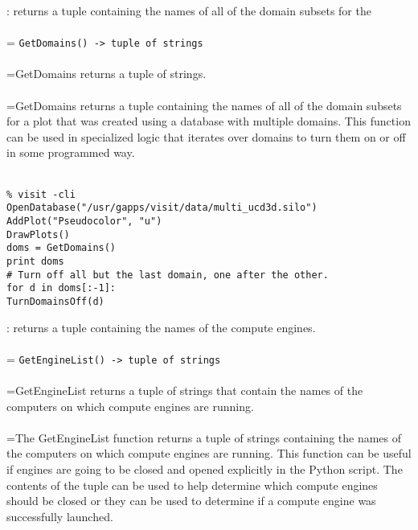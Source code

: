 \documentclass[10pt,a4paper]{report}
\begin{document}
{}
: returns a tuple containing the names of all of the domain subsets for the\\[-3mm]

 \\ 
\hangindent=\parindent 
\verb!GetDomains() -> tuple of strings!\\ [-3mm]

 \\ 
\hangindent=\parindent GetDomains returns a tuple of strings. \\[-3mm] 

 \\ 
\hangindent=\parindent GetDomains returns a tuple containing the names of all of the domain subsets for a plot that was created using a database with multiple domains. This function can be used in specialized logic that iterates over domains to turn them on or off in some programmed way. \\[-3mm] 

\\[-6mm]
\begin{verbatim}% visit -cli
OpenDatabase("/usr/gapps/visit/data/multi_ucd3d.silo")
AddPlot("Pseudocolor", "u")
DrawPlots()
doms = GetDomains()
print doms
# Turn off all but the last domain, one after the other.
for d in doms[:-1]:
TurnDomainsOff(d)
\end{verbatim}
\newpage


{}
: returns a tuple containing the names of the compute engines.\\[-3mm]

 \\ 
\hangindent=\parindent 
\verb!GetEngineList() -> tuple of strings!\\ [-3mm]

 \\ 
\hangindent=\parindent GetEngineList returns a tuple of strings that contain the names of the computers on which compute engines are running. \\[-3mm] 

 \\ 
\hangindent=\parindent The GetEngineList function returns a tuple of strings containing the names of the computers on which compute engines are running. This function can be useful if engines are going to be closed and opened explicitly in the Python script. The contents of the tuple can be used to help determine which compute engines should be closed or they can be used to determine if a compute engine was successfully launched. \\[-3mm] 
\end{document}

